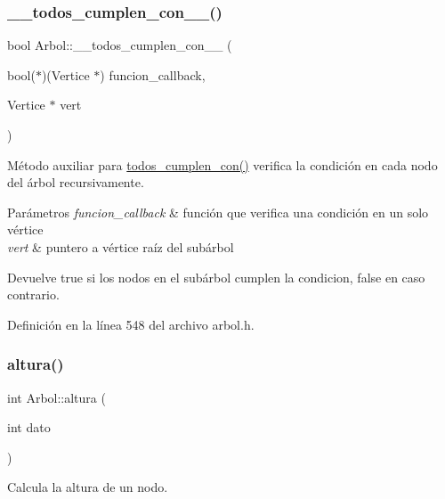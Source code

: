 \subsubsection{\texorpdfstring{\+\_\+\+\_\+todos\+\_\+cumplen\+\_\+con\+\_\+\+\_\+()}{\_\_todos\_cumplen\_con\_\_()}}
{\footnotesize\ttfamily bool Arbol\+::\+\_\+\+\_\+todos\+\_\+cumplen\+\_\+con\+\_\+\+\_\+ (\begin{DoxyParamCaption}\item[{bool($\ast$)(Vertice $\ast$)}]{funcion\+\_\+callback,  }\item[{Vertice $\ast$}]{vert }\end{DoxyParamCaption})\hspace{0.3cm}{\ttfamily [protected]}}



Método auxiliar para \hyperlink{classArbol_aba4b09fef18152beb43e04fee7394f34}{todos\+\_\+cumplen\+\_\+con()} verifica la condición en cada nodo del árbol recursivamente. 


\begin{DoxyParams}{Parámetros}
{\em funcion\+\_\+callback} & función que verifica una condición en un solo vértice \\
\hline
{\em vert} & puntero a vértice raíz del subárbol \\
\hline
\end{DoxyParams}
\begin{DoxyReturn}{Devuelve}
true si los nodos en el subárbol cumplen la condicion, false en caso contrario. 
\end{DoxyReturn}


Definición en la línea 548 del archivo arbol.\+h.

\mbox{\label{classArbol_a98151655f0dab81b40d34f87fbbd90cd}} 
\subsubsection{\texorpdfstring{altura()}{altura()}\hspace{0.1cm}{\footnotesize\ttfamily [1/3]}}
{\footnotesize\ttfamily int Arbol\+::altura (\begin{DoxyParamCaption}\item[{int}]{dato }\end{DoxyParamCaption})}



Calcula la altura de un nodo. 


